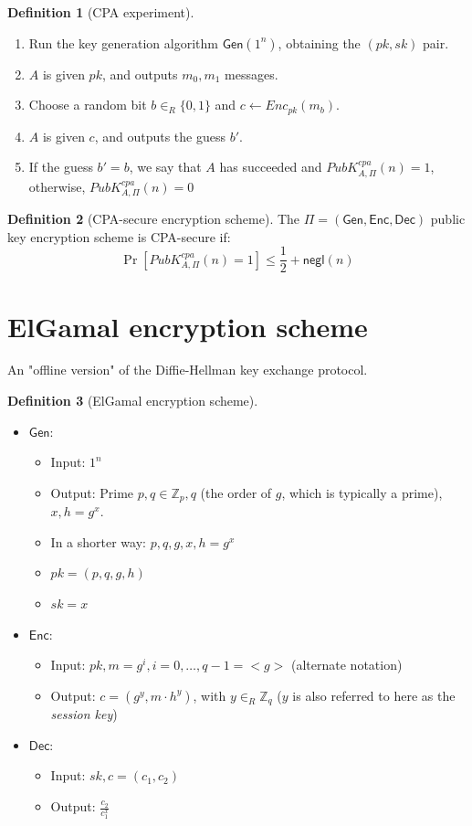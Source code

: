 \documentclass[11pt]{article}
\theoremstyle{definition}
\newtheorem{definition}{Definition}[section]
\theoremstyle{proof}
\newcommand{\Gen}{\mathsf{Gen}}
\newcommand{\Enc}{\mathsf{Enc}}
\newcommand{\Dec}{\mathsf{Dec}}
\newcommand{\negl}{\mathsf{negl}}
\begin{document}
\begin{definition}[CPA experiment]
	\leavevmode
	\begin{enumerate}
		\item Run the key generation algorithm $\Gen(1^n)$, obtaining the $(pk, sk)$ pair.
		\item $A$ is given $pk$, and outputs $m_0, m_1$ messages.
		\item Choose a random bit $b \in_R \{0,1\}$ and $c \leftarrow Enc_{pk}(m_b)$.
		\item $A$ is given $c$, and outputs the guess $b'$.
		\item If the guess $b' = b$, we say that $A$ has succeeded and $PubK^{cpa}_{A, \Pi}(n) = 1$, otherwise, $PubK^{cpa}_{A, \Pi}(n) = 0$
	\end{enumerate}
\end{definition}

\begin{definition}[CPA-secure encryption scheme]
	The $\Pi = (\Gen, \Enc, \Dec)$ public key encryption scheme is CPA-secure if:
	$$
	\Pr[PubK_{A, \Pi}^{cpa}(n) = 1] \le \frac{1}{2} + \negl(n)
	$$
\end{definition}

\section{ElGamal encryption scheme}

An "offline version" of the Diffie-Hellman key exchange protocol.

\begin{definition}[ElGamal encryption scheme]
	\leavevmode
	\begin{itemize}
		\item $\Gen$:
		\begin{itemize}
			\item Input: $1^n$
			\item Output: Prime $p, q \in \mathbb{Z}_p, q$ (the order of $g$, which is typically a prime), $x, h = g^x$.
			\item In a shorter way: $p, q, g, x, h=g^x$
			\item $pk = (p, q, g, h)$
			\item $sk = x$
		\end{itemize}
		\item $\Enc$:
		\begin{itemize}
			\item Input: $pk, m = {g^i, i=0, \dots, q-1} = <g>$ (alternate notation)
			\item Output: $c = (g^y, m \cdot h^y)$, with $y \in_R \mathbb{Z}_q$ ($y$ is also referred to here as the \emph{session key})
		\end{itemize}
		\item $\Dec$:
		\begin{itemize}
			\item Input: $sk, c = (c_1, c_2)$
			\item Output: $\frac{c_2}{c_1^x}$
		\end{itemize}
	\end{itemize}
\end{definition}
\end{document}
